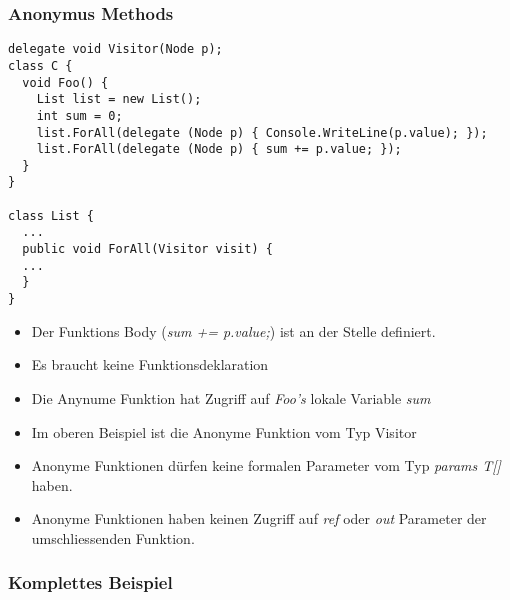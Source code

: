 \subsubsection{Anonymus Methods}
\begin{lstlisting}[style=CSharp]
delegate void Visitor(Node p);
class C {
  void Foo() {
    List list = new List();
    int sum = 0;
    list.ForAll(delegate (Node p) { Console.WriteLine(p.value); });
    list.ForAll(delegate (Node p) { sum += p.value; });
  }
}

class List {
  ...
  public void ForAll(Visitor visit) {
  ...
  }
}
\end{lstlisting}
\begin{itemize}
  \item  Der Funktions Body (\textit{sum += p.value;}) ist an der Stelle definiert.
  \item  Es braucht keine Funktionsdeklaration
  \item  Die Anynume Funktion hat Zugriff auf \textit{Foo's} lokale Variable \textit{sum}
  \item  Im oberen Beispiel ist die Anonyme Funktion vom Typ Visitor
  \item  Anonyme Funktionen dürfen keine formalen Parameter vom Typ \textit{params T[]} haben.
  \item  Anonyme Funktionen haben keinen Zugriff auf \textit{ref} oder \textit{out}
         Parameter der umschliessenden Funktion.
\end{itemize}

\subsubsection{Komplettes Beispiel}

